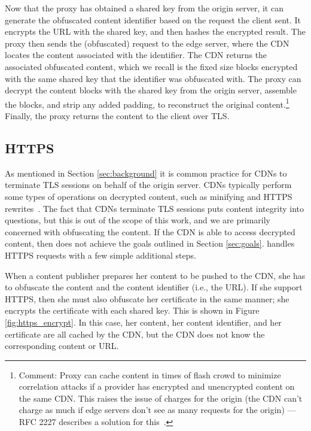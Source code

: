 Now that the proxy has obtained a shared key from the origin server, it can generate the obfuscated content identifier based 
on the request the client sent.  It encrypts the URL with the shared key, and then hashes the encrypted result.  The proxy then 
sends the (obfuscated) request to the edge server, where the CDN locates the content associated with the identifier.  The CDN returns 
the associated obfuscated content, which we recall is the fixed size blocks encrypted with the same shared key that the identifier was 
obfuscated with.  The proxy can decrypt the content blocks with the shared key from the origin server, assemble the blocks, and strip any 
added padding, to reconstruct the original content.\footnote{Comment: Proxy can cache content in times of flash crowd to minimize correlation attacks if a provider has encrypted and unencrypted content on the same CDN.  This raises the issue of charges for the origin (the CDN can’t charge as much if edge servers don’t see as many requests for the origin) --- RFC 2227 describes a solution for this~\cite{rfc2227}.}  Finally, the proxy returns the content to the client over TLS.  

\subsection{HTTPS}
As mentioned in Section \ref{sec:background} it is common practice for CDNs to terminate TLS sessions on behalf of the origin 
server.  CDNs typically perform some types of operations on decrypted content, such as minifying and HTTPS rewrites~\cite{levy2015stickler}.  The fact 
that CDNs terminate TLS sessions puts content integrity into questions, but this is out of the scope of this work, and we are 
primarily concerned with obfuscating the content.  If the CDN is able to access decrypted content, then \system{} does not 
achieve the goals outlined in Section \ref{sec:goals}.  \system{} handles HTTPS requests with a few simple additional steps.

When a content publisher prepares her content to be pushed to the CDN, she has to obfuscate the content and the content identifier (i.e., the 
URL).  If she support HTTPS, then she must also obfuscate her certificate in the same manner; she encrypts the certificate with each shared 
key.  This is shown in Figure \ref{fig:https_encrypt}.  In this case, her content, her content identifier, and her certificate are all cached 
by the CDN, but the CDN does not know the corresponding content or URL.  

